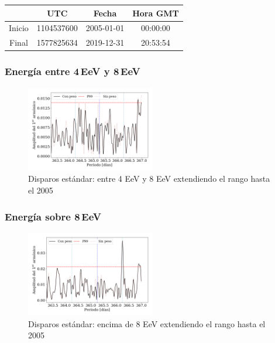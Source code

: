 	\begin{table}[H]
	\centering
		\begin{tabular}{c|c|c|c}
	 		& UTC 			& Fecha		 	&  Hora GMT  \\ \hline
	Inicio	& 1104537600	&2005-01-01 	&00:00:00		\\
	Final 	& 1577825634	&2019-12-31 	&20:53:54		\\
		\end{tabular}
	\end{table}


\subsubsection{Energía entre 4\,EeV y 8\,EeV}

\begin{figure}[H]
	\centering
	\includegraphics[width=0.5\textwidth]{2019_Main_Array_4_8_EeV_con_vs_sin_peso_extended.png}
	\caption{Disparos estándar: entre 4 EeV y 8 EeV extendiendo el rango hasta el 2005}
	\label{fig:48w_extended}
\end{figure}

\subsubsection{Energía sobre 8\,EeV}


\begin{figure}[H]
	\centering
	\includegraphics[width=0.5\textwidth]{2019_Main_Array_8_EeV_con_vs_sin_peso_extended.png}
	\caption{Disparos estándar: encima de 8 EeV extendiendo el rango hasta el 2005}
	\label{fig:8w_extended}
\end{figure}
